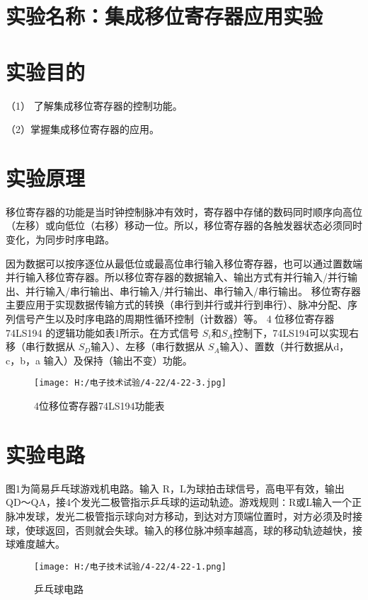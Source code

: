 \documentclass{article}
\begin{document}
	\section{ 实验名称：集成移位寄存器应用实验}
    \section{ 实验目的}
     （1） 了解集成移位寄存器的控制功能。\par 
               （2）掌握集成移位寄存器的应用。\par
   	\section{ 实验原理}
      
       移位寄存器的功能是当时钟控制脉冲有效时，寄存器中存储的数码同时顺序向高位（左移）或向低位（右移）移动一位。所以，移位寄存器的各触发器状态必须同时变化，为同步时序电路。\par
       因为数据可以按序逐位从最低位或最高位串行输入移位寄存器，也可以通过置数端并行输入移位寄存器。所以移位寄存器的数据输入、输出方式有并行输入/并行输出、并行输入/串行输出、串行输入/并行输出、串行输入/串行输出。
       移位寄存器主要应用于实现数据传输方式的转换（串行到并行或并行到串行）、脉冲分配、序列信号产生以及时序电路的周期性循环控制（计数器）等。
       4 位移位寄存器 74LS194 的逻辑功能如表1所示。在方式信号 $S_i$和$ S_A$控制下，74LS194可以实现右移（串行数据从 $S_D$输入）、左移（串行数据从 $ S_A$输入）、置数（并行数据从d，c，b，a 输入）及保持（输出不变）功能。
       \begin{figure*}[h]
        \centering
        \texttt{[image: H:/电子技术试验/4-22/4-22-3.jpg]}
        \caption{4位移位寄存器74LS194功能表} \label{fig:aa}
        \end{figure*}
   \newpage    
\section{实验电路}

       图1为简易乒乓球游戏机电路。输入 R，L为球拍击球信号，高电平有效，输出 QD～QA，接4个发光二极管指示乒乓球的运动轨迹。游戏规则∶R或L输入一个正脉冲发球，发光二极管指示球向对方移动，到达对方顶端位置时，对方必须及时接球，使球返回，否则就会失球。输入的移位脉冲频率越高，球的移动轨迹越快，接球难度越大。
       \begin{figure}[h]
        \centering
        \texttt{[image: H:/电子技术试验/4-22/4-22-1.png]}
        \caption{乒乓球电路} \label{fig:aa}
        \end{figure}
       
\end{document}
